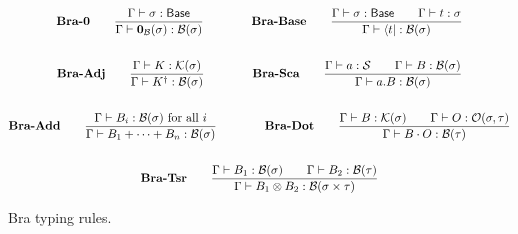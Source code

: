 \documentclass{article}
\begin{document}
\begin{figure}[h]
    \begin{gather*}
        \textbf{Bra-0} \qquad
        \frac{\Gamma \vdash \sigma : \mathsf{Base}}{\Gamma \vdash \mathbf{0}_\mathcal{B}(\sigma) : \mathcal{B}(\sigma)} 
        \qquad \qquad
        \textbf{Bra-Base} \qquad
        \frac{\Gamma \vdash \sigma : \mathsf{Base} \qquad \Gamma\vdash t : \sigma}{\Gamma \vdash \bra{t} : \mathcal{B}(\sigma)} \\
        \\
        \textbf{Bra-Adj} \qquad
        \frac{\Gamma \vdash K : \mathcal{K}(\sigma)}{\Gamma \vdash K^\dagger : \mathcal{B}(\sigma)} 
        \qquad \qquad
        \textbf{Bra-Sca} \qquad
        \frac{\Gamma \vdash a : \mathcal{S} \qquad \Gamma \vdash B : \mathcal{B}(\sigma)}{\Gamma \vdash a.B : \mathcal{B}(\sigma)} \\
        \\
        \textbf{Bra-Add} \qquad
        \frac{\Gamma \vdash B_i : \mathcal{B}(\sigma) \text{ for all $i$}}{\Gamma \vdash B_1 + \cdots + B_n : \mathcal{B}(\sigma)}
        \qquad \qquad
        \textbf{Bra-Dot} \qquad
        \frac{\Gamma \vdash B : \mathcal{K}(\sigma) \qquad \Gamma \vdash O : \mathcal{O}(\sigma, \tau)}{\Gamma \vdash B \cdot O : \mathcal{B}(\tau)} \\
        \\
        \textbf{Bra-Tsr} \qquad
        \frac{\Gamma \vdash B_1 : \mathcal{B}(\sigma) \qquad \Gamma \vdash B_2 : \mathcal{B}(\tau)} {\Gamma \vdash B_1 \otimes B_2 : \mathcal{B}(\sigma \times \tau)}
    \end{gather*}
    \caption{Bra typing rules.}
\end{figure}
\end{document}
